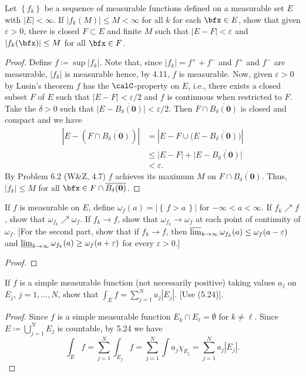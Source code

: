 \begin{problem}
Let $\left\{f_k\right\}$ be a sequence of measurable functions defined on a
measurable set $E$ with $|E|<\infty$. If $|f_k(M)|\leq M<\infty$ for all
$k$ for each $\bfx\in E$, show that given $\varepsilon>0$, there is closed
$F\subset E$ and finite $M$ such that $|E\minus F|<\varepsilon$ and
$|f_k(\bfx)|\leq M$ for all $\bfx\in F$.
\end{problem}
\begin{proof}
Define $f\coloneqq\sup|f_k|$. Note that, since $|f_k|=f^++f^-$ and $f^+$
and $f^-$ are measurable, $|f_k|$ is measurable hence, by 4.11, $f$ is
measurable. Now, given $\varepsilon>0$ by Lusin's theorem $f$ has the
$\calC$-property on $E$, i.e., there exists a closed subset $F$ of $E$ such
that $|E\minus F|<\varepsilon/2$ and $f$ is continuous when restricted to
$F$. Take the $\delta>0$ such that
$\bigl|E\minus\overline{B_\delta(\mathbf{0})}\bigr|<\varepsilon/2$. Then
$F\cap\overline{B_\delta(\mathbf{0})}$ is closed and compact and we have
\begin{align*}
\left|E\minus(F\cap\overline{B_\delta(\mathbf{0})})\right|
&=\left|E\minus F\cup
  \bigl(E\minus\overline{B_\delta(\mathbf{0})}\bigr)\right|\\
&\leq|E\minus F|+\bigl|E\minus\overline{B_\delta(\mathbf{0})}\bigr|\\
&<\varepsilon.
\end{align*}
By Problem 6.2 (W\&Z, 4.7) $f$ achieves its maximum $M$ on
$F\cap\overline{B_\delta(\mathbf{0})}$. Thus, $|f_k|\leq M$ for all
$\bfx\in F\cap\overline{B_\delta(\mathbf{0})}$.
\end{proof}
\newpage

\begin{problem}
If $f$ is measurable on $E$, define
$\omega_f(a)=\left|\left\{\,f>a\,\right\}\right|$ for
$-\infty<a<\infty$. If $f_k\nearrow f$, show that
$\omega_{f_k}\nearrow\omega_f$. If $f_k\to f$, show that
$\omega_{f_k}\to\omega_f$ at each point of continuity of $\omega_f$. [For
the second part, show that if $f_k\to f$, then
$\varlimsup_{k\to\infty}\omega_{f_k}(a)\leq\omega_f(a-\varepsilon)$ and
$\varliminf_{k\to\infty}\omega_{f_k}(a)\geq\omega_f(a+\varepsilon)$ for every
$\varepsilon>0$.]
\end{problem}
\begin{proof}
\end{proof}
\newpage

\begin{problem}
If $f$ is a simple measurable function (not necessarily positive) taking
values $a_j$ on $E_j$, $j=1,...,N$, show that $\int_E f=\sum_{j=1}^N
a_j\left|E_j\right|$. [Use (5.24)].
\end{problem}
\begin{proof}
Since $f$ is a simple measurable function $E_k\cap E_\ell=\emptyset$ for
$k\neq\ell$. Since $E\coloneqq\bigcup_{j=1}^N E_j$ is countable, by 5.24 we
have
\[
\int_E f=\sum_{j=1}^N\int_{E_j} f=\sum_{j=1}^N\int a_j\chi_{E_j}=\sum_{j=1}^N a_j|E_j|.
\]
\end{proof}
\newpage

